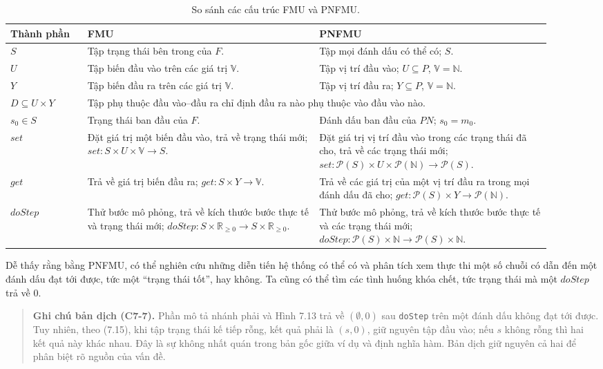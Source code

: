 \begin{table}[htbp]
\centering\small
\begin{tabular}{p{0.13\linewidth}p{0.39\linewidth}p{0.39\linewidth}}
\hline
Thành phần&FMU&PNFMU\\\hline
$S$&Tập trạng thái bên trong của $F$.&Tập mọi đánh dấu có thể có; $S$.\\
$U$&Tập biến đầu vào trên các giá trị $\mathbb{V}$.&Tập vị trí đầu vào; $U\subseteq P$, $\mathbb{V}=\mathbb{N}$.\\
$Y$&Tập biến đầu ra trên các giá trị $\mathbb{V}$.&Tập vị trí đầu ra; $Y\subseteq P$, $\mathbb{V}=\mathbb{N}$.\\
$D\subseteq U\times Y$&\multicolumn{2}{p{0.78\linewidth}}{Tập phụ thuộc đầu vào--đầu ra chỉ định đầu ra nào phụ thuộc vào đầu vào nào.}\\
$s_0\in S$&Trạng thái ban đầu của $F$.&Đánh dấu ban đầu của $PN$; $s_0=m_0$.\\
$set$&Đặt giá trị một biến đầu vào, trả về trạng thái mới; $set:S\times U\times\mathbb{V}\to S$.&Đặt giá trị vị trí đầu vào trong các trạng thái đã cho, trả về các trạng thái mới; $set:\mathcal{P}(S)\times U\times\mathcal{P}(\mathbb{N})\to\mathcal{P}(S)$.\\
$get$&Trả về giá trị biến đầu ra; $get:S\times Y\to\mathbb{V}$.&Trả về các giá trị của một vị trí đầu ra trong mọi đánh dấu đã cho; $get:\mathcal{P}(S)\times Y\to\mathcal{P}(\mathbb{N})$.\\
$doStep$&Thử bước mô phỏng, trả về kích thước bước thực tế và trạng thái mới; $doStep:S\times\mathbb{R}_{\geq0}\to S\times\mathbb{R}_{\geq0}$.&Thử bước mô phỏng, trả về kích thước bước thực tế và các trạng thái mới; $doStep:\mathcal{P}(S)\times\mathbb{N}\to\mathcal{P}(S)\times\mathbb{N}$.\\\hline
\end{tabular}
\caption{So sánh các cấu trúc FMU và PNFMU.}
\end{table}

Dễ thấy rằng bằng PNFMU, có thể nghiên cứu những diễn tiến hệ thống có thể có và phân tích xem thực thi một số chuỗi có dẫn đến một đánh dấu đạt tới được, tức một ``trạng thái tốt'', hay không. Ta cũng có thể tìm các tình huống khóa chết, tức trạng thái mà một $doStep$ trả về 0.

\begin{quote}
\small\textbf{Ghi chú bản dịch (C7-7).} Phần mô tả nhánh phải và Hình 7.13 trả về $(\emptyset,0)$ sau \texttt{doStep} trên một đánh dấu không đạt tới được. Tuy nhiên, theo (7.15), khi tập trạng thái kế tiếp rỗng, kết quả phải là $(s,0)$, giữ nguyên tập đầu vào; nếu $s$ không rỗng thì hai kết quả này khác nhau. Đây là sự không nhất quán trong bản gốc giữa ví dụ và định nghĩa hàm. Bản dịch giữ nguyên cả hai để phân biệt rõ nguồn của vấn đề.
\end{quote}


